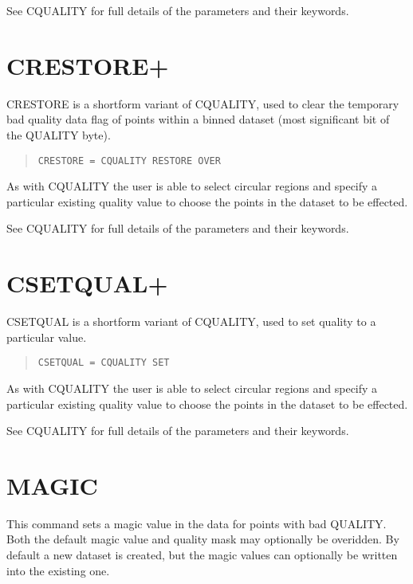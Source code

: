 \documentclass{book}
\renewcommand{\_}{{\tt\char'137}}     %
\begin{document}
See CQUALITY for full details of the parameters and their keywords.
 
\section{CRESTORE+}
CRESTORE is a shortform variant of CQUALITY, used to clear the
temporary bad quality data flag of points within a binned
dataset (most significant bit of the QUALITY byte).
\begin{quote}\begin{verbatim}
CRESTORE = CQUALITY RESTORE OVER
\end{verbatim}\end{quote}
As with CQUALITY the user is able to select circular regions and
specify a particular existing quality value to choose the points
in the dataset to be effected.
 
See CQUALITY for full details of the parameters and their keywords.
 
\section{CSETQUAL+}
CSETQUAL is a shortform variant of CQUALITY, used to set
quality to a particular value.
\begin{quote}\begin{verbatim}
CSETQUAL = CQUALITY SET
\end{verbatim}\end{quote}
As with CQUALITY the user is able to select circular regions and
specify a particular existing quality value to choose the points
in the dataset to be effected.
 
See CQUALITY for full details of the parameters and their keywords.
 
\section{MAGIC}
This command sets a magic value in the data for points with bad
QUALITY. Both the default magic value and quality mask may optionally
be overidden. By default a new dataset is created, but the magic
values can optionally be written into the existing one.
 
\end{document}
